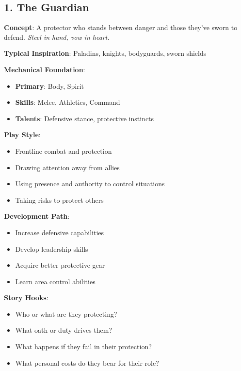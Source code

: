 \begin{multicols}{2}
\section{1. The Guardian}

\textbf{Concept}: A protector who stands between danger and those they've sworn to defend. \emph{Steel in hand, vow in heart.}

\textbf{Typical Inspiration}: Paladins, knights, bodyguards, sworn shields

\textbf{Mechanical Foundation}:
\begin{itemize}
\item \textbf{Primary}: Body, Spirit
\item \textbf{Skills}: Melee, Athletics, Command
\item \textbf{Talents}: Defensive stance, protective instincts
\end{itemize}

\textbf{Play Style}:
\begin{itemize}
\item Frontline combat and protection
\item Drawing attention away from allies
\item Using presence and authority to control situations
\item Taking risks to protect others
\end{itemize}

\textbf{Development Path}:
\begin{itemize}
\item Increase defensive capabilities
\item Develop leadership skills
\item Acquire better protective gear
\item Learn area control abilities
\end{itemize}

\textbf{Story Hooks}:
\begin{itemize}
\item Who or what are they protecting?
\item What oath or duty drives them?
\item What happens if they fail in their protection?
\item What personal costs do they bear for their role?
\end{itemize}


\end{multicols}
